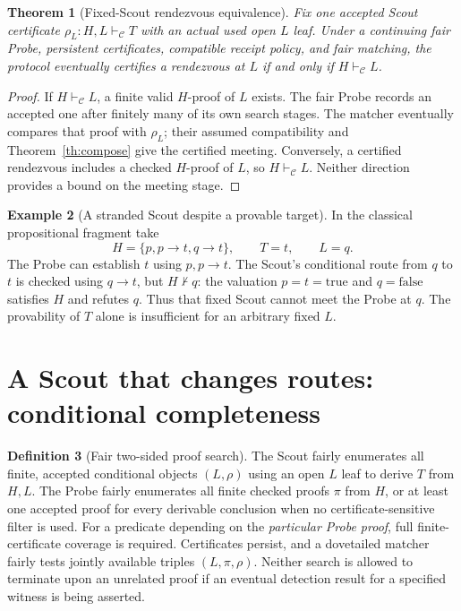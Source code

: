 \documentclass[11pt,letterpaper]{article}
\newtheorem{theorem}{Theorem}[section]
\theoremstyle{definition}
\newtheorem{definition}[theorem]{Definition}
\newtheorem{example}[theorem]{Example}
\newcommand{\vdC}{\vdash_{\mathcal C}}
\begin{document}
\begin{theorem}[Fixed-Scout rendezvous equivalence]\label{th:fixed}
Fix one accepted Scout certificate $\rho_L:H,L\vdC T$ with an actual used
open $L$ leaf. Under a continuing fair Probe, persistent certificates,
compatible receipt policy, and fair matching, the protocol eventually
certifies a rendezvous \emph{at $L$} if and only if $H\vdC L$.
\end{theorem}
\begin{proof}
If $H\vdC L$, a finite valid $H$-proof of $L$ exists. The fair Probe
records an accepted one after finitely many of its own search stages. The
matcher eventually compares that proof with $\rho_L$; their assumed
compatibility and Theorem~\ref{th:compose} give the certified meeting.
Conversely, a certified rendezvous includes a checked $H$-proof of $L$,
so $H\vdC L$. Neither direction provides a bound on the meeting stage.
\end{proof}

\begin{example}[A stranded Scout despite a provable target]\label{ex:stranded}
In the classical propositional fragment take
\[
 H=\{p,p\to t,q\to t\},\qquad T=t,\qquad L=q.
\]
The Probe can establish $t$ using $p,p\to t$. The Scout's conditional
route from $q$ to $t$ is checked using $q\to t$, but $H\nvdash q$:
the valuation $p=t=\mathrm{true}$ and $q=\mathrm{false}$ satisfies $H$
and refutes $q$. Thus that fixed Scout cannot meet the Probe at $q$.
The provability of $T$ alone is insufficient for an arbitrary fixed $L$.
\end{example}

\section{A Scout that changes routes: conditional completeness}
\begin{definition}[Fair two-sided proof search]
The Scout fairly enumerates all finite, accepted conditional objects
$(L,\rho)$ using an open $L$ leaf to derive $T$ from $H,L$. The Probe
fairly enumerates all finite checked proofs $\pi$ from $H$, or at least
one accepted proof for every derivable conclusion when no certificate-sensitive
filter is used. For a predicate depending on the \emph{particular Probe proof},
full finite-certificate coverage is required. Certificates persist, and
a dovetailed matcher fairly tests jointly available triples $(L,\pi,\rho)$.
Neither search is allowed to terminate upon an unrelated proof if an
eventual detection result for a specified witness is being asserted.
\end{definition}
\end{document}
